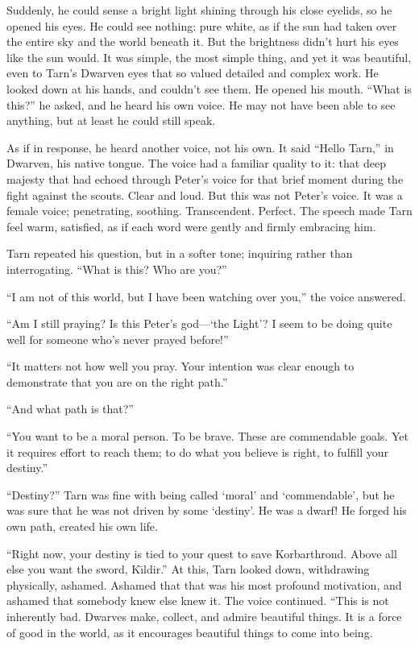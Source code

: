 Suddenly, he could sense a bright light shining through his close eyelids, so he opened his eyes.  He could see nothing: pure white, as if the sun had taken over the entire sky and the world beneath it.  But the brightness didn't hurt his eyes like the sun would.  It was simple, the most simple thing, and yet it was beautiful, even to Tarn's Dwarven eyes that so valued detailed and complex work.  He looked down at his hands, and couldn't see them.  He opened his mouth.  ``What is this?'' he asked, and he heard his own voice.  He may not have been able to see anything, but at least he could still speak.

As if in response, he heard another voice, not his own.  It said ``Hello Tarn,''  in Dwarven, his native tongue.  The voice had a familiar quality to it: that deep majesty that had echoed through Peter's voice for that brief moment during the fight against the scouts.  Clear and loud.  But this was not Peter's voice.  It was a female voice; penetrating, soothing.  Transcendent.  Perfect.  The speech made Tarn feel warm, satisfied, as if each word were gently and firmly embracing him.

Tarn repeated his question, but in a softer tone; inquiring rather than interrogating.  ``What is this?  Who are you?''

``I am not of this world, but I have been watching over you,'' the voice answered.

``Am I still praying?  Is this Peter's god---`the Light'?  I seem to be doing quite well for someone who's never prayed before!''

``It matters not how well you pray.  Your intention was clear enough to demonstrate that you are on the right path.''

``And what path is that?''

``You want to be a moral person.  To be brave.  These are commendable goals.  Yet it requires effort to reach them; to do what you believe is right, to fulfill your destiny.''

``Destiny?'' Tarn was fine with being called `moral' and `commendable', but he was sure that he was not driven by some `destiny'.  He was a dwarf!  He forged his own path, created his own life.

``Right now, your destiny is tied to your quest to save Korbarthrond.  Above all else you want the sword, K\=\i{}ldir.''  At this, Tarn looked down, withdrawing physically, ashamed.  Ashamed that that was his most profound motivation, and ashamed that somebody knew else knew it.  The voice continued. ``This is not inherently bad.  Dwarves make, collect, and admire beautiful things.  It is a force of good in the world, as it encourages beautiful things to come into being.

